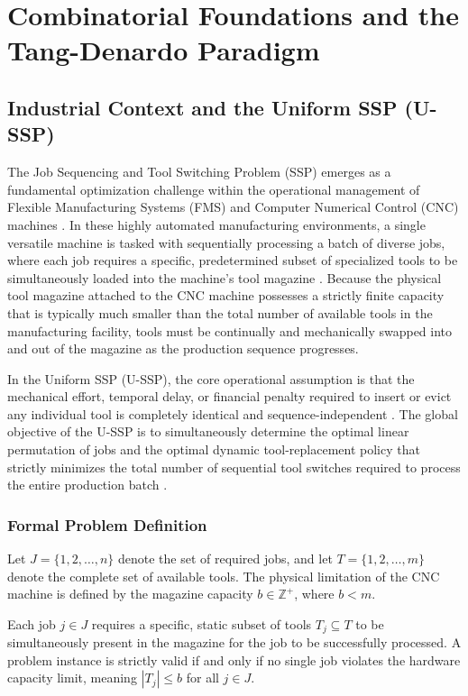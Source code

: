 \documentclass[11pt, a4paper]{book}
\begin{document}
	
	\chapter{Combinatorial Foundations and the Tang-Denardo Paradigm}
	
	\section{Industrial Context and the Uniform SSP (U-SSP)}
	
	The Job Sequencing and Tool Switching Problem (SSP) emerges as a fundamental optimization challenge within the operational management of Flexible Manufacturing Systems (FMS) and Computer Numerical Control (CNC) machines \cite{Tang1988}. In these highly automated manufacturing environments, a single versatile machine is tasked with sequentially processing a batch of diverse jobs, where each job requires a specific, predetermined subset of specialized tools to be simultaneously loaded into the machine's tool magazine \cite{Crama1994}. Because the physical tool magazine attached to the CNC machine possesses a strictly finite capacity that is typically much smaller than the total number of available tools in the manufacturing facility, tools must be continually and mechanically swapped into and out of the magazine as the production sequence progresses.
	
	In the Uniform SSP (U-SSP), the core operational assumption is that the mechanical effort, temporal delay, or financial penalty required to insert or evict any individual tool is completely identical and sequence-independent \cite{Crama1994}. The global objective of the U-SSP is to simultaneously determine the optimal linear permutation of jobs and the optimal dynamic tool-replacement policy that strictly minimizes the total number of sequential tool switches required to process the entire production batch \cite{Tang1988}.
	
	\subsection{Formal Problem Definition}
	
	Let $J = \{1, 2, \dots, n\}$ denote the set of required jobs, and let $T = \{1, 2, \dots, m\}$ denote the complete set of available tools. The physical limitation of the CNC machine is defined by the magazine capacity $b \in \mathbb{Z}^+$, where $b < m$. 
	
	Each job $j \in J$ requires a specific, static subset of tools $T_j \subseteq T$ to be simultaneously present in the magazine for the job to be successfully processed. A problem instance is strictly valid if and only if no single job violates the hardware capacity limit, meaning $|T_j| \le b$ for all $j \in J$. 
	
\end{document}
